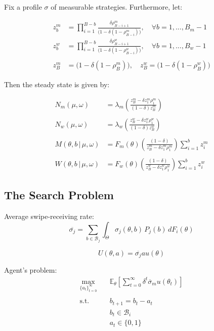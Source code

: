 \begin{theorem}
    Fix a profile $\sigma$ of measurable strategies. Furthermore, let:

$$
\begin{aligned} z^m_b &=\prod^{B-b}_{i=1}\frac{\delta\rho^m_{B-i+1}}{\Big(1-\delta (1-\rho^m_{B-i}) \Big)}, \quad \forall b=1,...,B_m-1\\z^w_b&=\prod^{B-b}_{i=1}\frac{\delta\rho^w_{B-i+1}}{\Big(1-\delta (1-\rho^w_{B-i}) \Big)} , \quad \forall b=1,...,B_w-1\\\\ z^m_B&=\Big(1-\delta (1-\rho^m_B) \Big),\quad z^w_B=\Big(1-\delta (1-\rho^w_B) \Big) \end{aligned}
$$

Then the steady state is given by:

$$
\begin{aligned}N_m(\mu,\omega)&=\lambda_m\left(\frac{z^m_B-\delta z^m_1\rho^m_1}{(1-\delta)z^m_B}\right)\\\\N_w(\mu,\omega)&=\lambda_w\left(\frac{z^w_B-\delta z^w_1\rho^w_1}{(1-\delta)z^w_B}\right)\\\\M(\theta,b\,|\,\mu,\omega)&=F_m(\theta) \left(\frac{(1-\delta)}{z^m_B-\delta z^m_1\rho^m_1}\right)\sum^b_{i=1} z^m_i\\\\W(\theta,b\,|\,\mu,\omega)&=F_w(\theta)\left(\frac{(1-\delta)}{z^w_B-\delta z^w_1\rho^w_1}\right)\sum^b_{i=1} z^w_i \end{aligned}
$$ 
\end{theorem} 



\subsection{The Search Problem}
Average swipe-receiving rate:
\begin{equation}
    \overline{\sigma_j} = \sum_{b\in \mathcal{B}_j}\int_{\Theta} \sigma_j(\theta,b)\,{P}_j(b)\,dF_i(\theta)
\end{equation} 

\begin{equation}
    U(\theta, a)=\overline{\sigma_j}au(\theta)
\end{equation}

Agent's problem:
\begin{equation}
    \begin{aligned} 
        \max_{\{a_t\}^\infty_{t=0}} \quad & \mathbb{E}_{\theta}\left[\sum^\infty_{t=0} \delta^{t} \overline\sigma_m u(\theta_t)\right]\\\\ 
        \textrm{s.t.} \quad & b_{t+1}  = b_t -a_t \\
        & b_t\in \mathcal{B}_i \\
        & a_t\in \{0,1\}  
    \end{aligned}
\end{equation}

